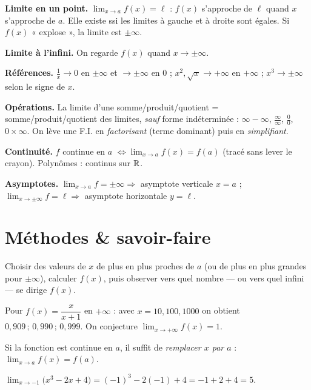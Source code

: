 \begin{synthese}
\textbf{Limite en un point.} $\displaystyle\lim_{x\to a}f(x)=\ell$ : $f(x)$ s'approche
de $\ell$ quand $x$ s'approche de $a$. Elle existe ssi les limites à gauche et à droite
sont égales. Si $f(x)$ « explose », la limite est $\pm\infty$.

\smallskip
\textbf{Limite à l'infini.} On regarde $f(x)$ quand $x\to\pm\infty$.

\smallskip
\textbf{Références.} $\frac1x\to 0$ en $\pm\infty$ et $\to\pm\infty$ en $0$ ;
$x^2,\sqrt{x}\to +\infty$ en $+\infty$ ; $x^3\to\pm\infty$ selon le signe de $x$.

\smallskip
\textbf{Opérations.} La limite d'une somme/produit/quotient = somme/produit/quotient
des limites, \emph{sauf} forme indéterminée : $\infty-\infty$, $\frac{\infty}{\infty}$,
$\frac00$, $0\times\infty$. On lève une F.I. en \emph{factorisant} (terme dominant) puis
en \emph{simplifiant}.

\smallskip
\textbf{Continuité.} $f$ continue en $a$ $\iff \displaystyle\lim_{x\to a}f(x)=f(a)$
(tracé sans lever le crayon). Polynômes : continus sur $\mathbb{R}$.

\smallskip
\textbf{Asymptotes.} $\displaystyle\lim_{x\to a}f=\pm\infty \Rightarrow$ asymptote
verticale $x=a$ ; $\displaystyle\lim_{x\to\pm\infty}f=\ell \Rightarrow$ asymptote
horizontale $y=\ell$.
\end{synthese}

\section{Méthodes \& savoir-faire}

Choisir des valeurs de $x$ de plus en plus proches de $a$ (ou de plus en plus grandes
pour $\pm\infty$), calculer $f(x)$, puis observer vers quel nombre — ou vers quel
infini — se dirige $f(x)$.
\begin{exemple}
Pour $f(x)=\dfrac{x}{x+1}$ en $+\infty$ : avec $x=10,100,1000$ on obtient
$0{,}909\,;\,0{,}990\,;\,0{,}999$. On conjecture $\displaystyle\lim_{x\to+\infty}f(x)=1$.
\end{exemple}

Si la fonction est continue en $a$, il suffit de \emph{remplacer $x$ par $a$} :
$\displaystyle\lim_{x\to a}f(x)=f(a)$.
\begin{exemple}
$\displaystyle\lim_{x\to -1}\big(x^3-2x+4\big)=(-1)^3-2(-1)+4=-1+2+4=5.$
\end{exemple}

